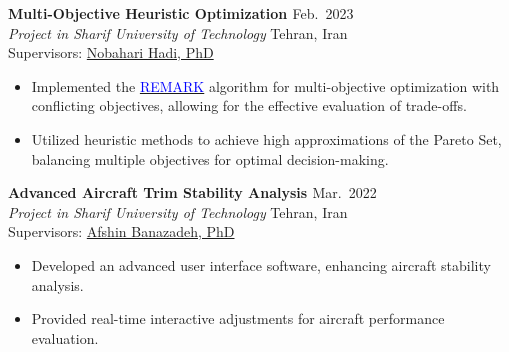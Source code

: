 \documentclass[12pt]{article}
\begin{document}
\noindent
{\bfseries Multi-Objective Heuristic Optimization
\href{https://github.com/alibaniasad1999/Heuristic-optimization-algorithms}{\faGithub}
}
\hfill Feb.\ 2023 \\[2pt]
\noindent \textit{Project in Sharif University of Technology} \hfill Tehran, Iran \\[2pt]
\noindent Supervisors:
\href{https://ae.sharif.edu/~portal/faculty/1091235256}{Nobahari Hadi, PhD}
\vspace{-4pt}
\begin{itemize}  \itemsep 1pt %
    \item Implemented the \href{https://link.springer.com/article/10.1007/s12652-022-04332-8}{\textcolor{blue}{REMARK}} algorithm for {multi-objective optimization} with {conflicting} objectives, allowing for the effective evaluation of trade-offs.
    \item Utilized {heuristic} methods to achieve high approximations of the {Pareto Set}, balancing multiple objectives for optimal decision-making.
\end{itemize}
\noindent
{\bfseries Advanced Aircraft Trim Stability Analysis
\href{https://github.com/alibaniasad1999/DATCOM-Trim-Diagram-GUI}{\faGithub}
}
\hfill Mar.\ 2022 \\[2pt]
\noindent \textit{Project in Sharif University of Technology} \hfill Tehran, Iran \\[2pt]
\noindent Supervisors:
\href{http://ae.sharif.edu/~portal/faculty/1014037799}{Afshin Banazadeh, PhD}
\vspace{-4pt}
\begin{itemize}  \itemsep 1pt %
    \item Developed an advanced {user interface} software, enhancing aircraft  {stability analysis}.
    \item Provided {real-time} {interactive} adjustments for aircraft performance {evaluation}.
\end{itemize}
\end{document}
